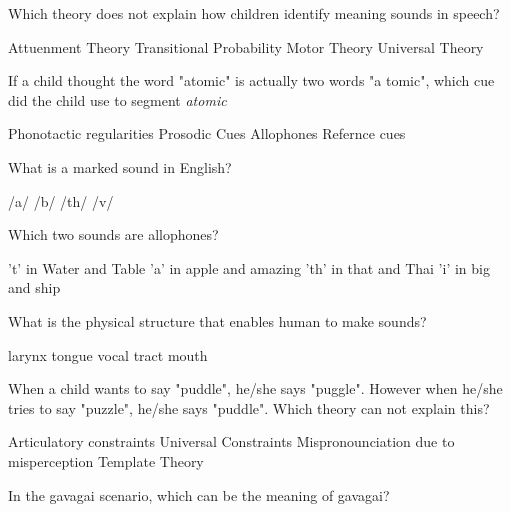 \documentclass[legalpaper, 12pt, addpoints, answers]{exam}
\begin{document}
\begin{questions}
\question Which theory does not explain how children identify meaning sounds in speech?

        \begin{choices}
            \choice Attuenment Theory
            \choice Transitional Probability
            \choice Motor Theory
            \choice Universal Theory
        \end{choices}
        \vspace{0.15in}

        \question If a child thought the word "atomic" is actually two words "a tomic", which cue did the child use to segment \textit{atomic}
        
   \begin{choices}
            \choice Phonotactic regularities
            \choice Prosodic Cues
            \choice Allophones
            \choice Refernce cues
\end{choices}
        \vspace{0.15in}

        \question What is a marked sound in English?
        
   \begin{oneparchoices}
            \choice /a/
            \choice /b/
            \choice /th/
            \choice /v/
   \end{oneparchoices}
        
        \vspace{0.15in}

        \question Which two sounds are allophones?

\setlength{\multicolsep}{0.5em}
        \begin{choices}
            \choice 't' in  Water and Table
            \choice 'a' in apple and amazing
            \choice 'th' in that and Thai
            \choice 'i' in big and ship
        \end{choices}
        \vspace{0.15in}
        
\setlength{\multicolsep}{0.5em}
         \question What is the physical structure that enables human to make sounds?
         
    \begin{choices}
            \choice larynx
            \choice tongue
            \choice vocal tract
            \choice mouth
   \end{choices}
        \vspace{0.15in}

            \question When a child wants to say "puddle", he/she says "puggle". However when he/she tries to say "puzzle", he/she says "puddle". Which theory can not explain this?
        \begin{choices}
            \choice Articulatory constraints
            \choice Universal Constraints
            \choice Mispronounciation due to misperception
            \choice Template Theory
        \end{choices}
         \vspace{0.15in}    
        \question In the gavagai scenario, which can be the meaning of gavagai?
        

\end{questions}
\end{document}
